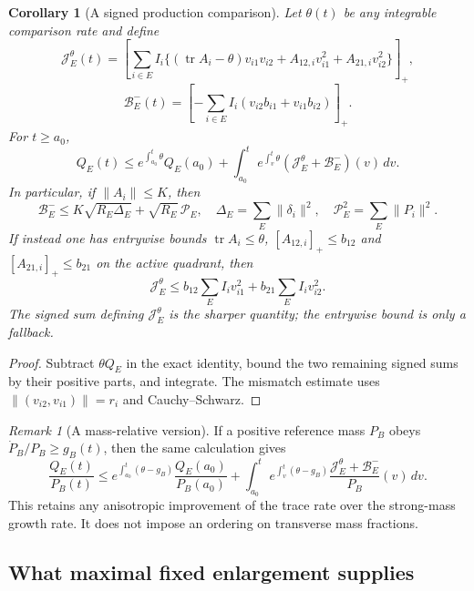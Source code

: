 \documentclass{article} %
\theoremstyle{plain}
\newtheorem{corollary}[theorem]{Corollary}
\theoremstyle{definition}
\theoremstyle{remark}
\newtheorem{remark}[theorem]{Remark}
\begin{document}
\begin{corollary}[A signed production comparison]
\label{sbflux:production}
Let $\theta(t)$ be any integrable comparison rate and define
\[
 \mathcal J_E^\theta(t)=\left[\sum_{i\in E}I_i
 \{(\operatorname{tr}A_i-\theta)v_{i1}v_{i2}
                 +A_{12,i}v_{i1}^2+A_{21,i}v_{i2}^2\}\right]_+,
\]
\[
 \mathcal B_E^-(t)=\left[-\sum_{i\in E}I_i
                  (v_{i2}b_{i1}+v_{i1}b_{i2})\right]_+.
\]
For $t\ge a_0$,
\begin{equation}\label{sbflux:Q-envelope}
 Q_E(t)\le e^{\int_{a_0}^t\theta}Q_E(a_0)
 +\int_{a_0}^t e^{\int_v^t\theta}
               (\mathcal J_E^\theta+\mathcal B_E^-)(v)\,dv.
\end{equation}
In particular, if $\|A_i\|\le K$, then
\[
 \mathcal B_E^-\le K\sqrt{R_E\Delta_E}+\sqrt{R_E}\,\mathcal P_E,
 \quad \Delta_E=\sum_E\|\delta_i\|^2,\quad
 \mathcal P_E^2=\sum_E\|P_i\|^2.
\]
If instead one has entrywise bounds
$\operatorname{tr}A_i\le\theta$, $[A_{12,i}]_+\le b_{12}$ and
$[A_{21,i}]_+\le b_{21}$ on the active quadrant, then
\[
 \mathcal J_E^\theta\le b_{12}\sum_E I_iv_{i1}^2
                              +b_{21}\sum_E I_iv_{i2}^2.
\]
The signed sum defining $\mathcal J_E^\theta$ is the sharper quantity;
the entrywise bound is only a fallback.
\end{corollary}
\begin{proof}
Subtract $\theta Q_E$ in the exact identity, bound the two remaining
signed sums by their positive parts, and integrate. The mismatch estimate
uses $\|(v_{i2},v_{i1})\|=r_i$ and Cauchy--Schwarz.
\end{proof}

\begin{remark}[A mass-relative version]
If a positive reference mass $P_B$ obeys
$\dot P_B/P_B\ge g_B(t)$, then the same calculation gives
\[
 \frac{Q_E(t)}{P_B(t)}\le
 e^{\int_{a_0}^t(\theta-g_B)}\frac{Q_E(a_0)}{P_B(a_0)}
 +\int_{a_0}^t e^{\int_v^t(\theta-g_B)}
       \frac{\mathcal J_E^\theta+\mathcal B_E^-}{P_B}(v)\,dv.
\]
This retains any anisotropic improvement of the trace rate over the
strong-mass growth rate. It does not impose an ordering on transverse
mass fractions.
\end{remark}

\subsection{What maximal fixed enlargement supplies}
\end{document}
